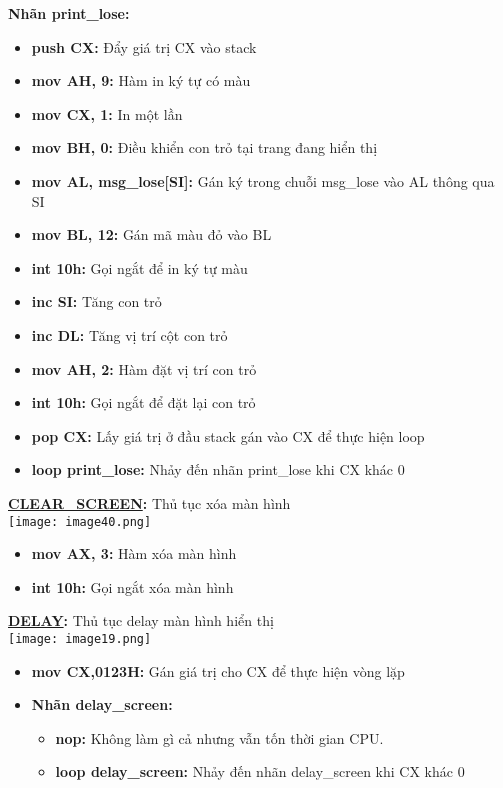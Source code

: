 \textbf{Nhãn print\_lose:}

\begin{itemize}
    \item\textbf{push CX:} Đẩy giá trị CX vào stack
    \item\textbf{mov AH, 9:} Hàm in ký tự có màu
    \item\textbf{mov CX, 1:} In một lần 
    \item\textbf{mov BH, 0:} Điều khiển con trỏ tại trang đang hiển thị 
    \item\textbf{mov AL, msg\_lose[SI]:} Gán ký trong chuỗi msg\_lose vào AL thông qua SI
    \item\textbf{mov BL, 12:} Gán mã màu đỏ vào BL
    \item\textbf{int 10h:} Gọi ngắt để in ký tự màu
    \item\textbf{inc SI: }Tăng con trỏ
    \item\textbf{inc DL: }Tăng vị trí cột con trỏ 
    \item\textbf{mov AH, 2:} Hàm đặt vị trí con trỏ
    \item\textbf{int 10h:} Gọi ngắt để đặt lại con trỏ
    \item\textbf{pop CX: }Lấy giá trị ở đầu stack gán vào CX để thực hiện loop 
    \item\textbf{loop print\_lose:} Nhảy đến nhãn print\_lose khi CX khác 0 
\end{itemize}

\textbf{\underline{CLEAR\_SCREEN}: }Thủ tục xóa màn hình\\
\texttt{[image: image40.png]}

\begin{itemize}
    \item \textbf{mov AX, 3:} Hàm xóa màn hình
    \item \textbf{int 10h: }Gọi ngắt xóa màn hình 
\end{itemize}
\textbf{\underline{DELAY}: }Thủ tục delay màn hình hiển thị\\
\texttt{[image: image19.png]}

\begin{itemize}
    \item \textbf{mov CX,0123H:} Gán giá trị cho CX để thực hiện vòng lặp
    \item \textbf{Nhãn delay\_screen:}
    \begin{itemize}
        \item \textbf{nop: }Không làm gì cả nhưng vẫn tốn thời gian CPU.
        \item \textbf{loop delay\_screen:} Nhảy đến nhãn delay\_screen khi CX khác 0 
    \end{itemize}
\end{itemize}

